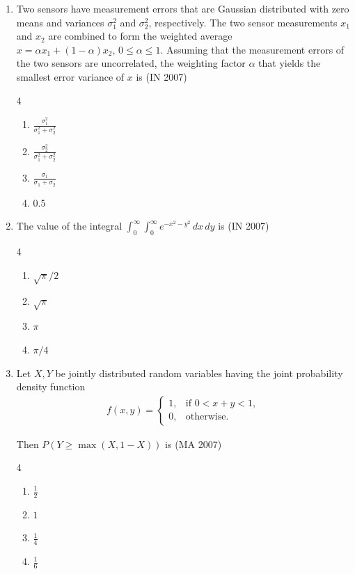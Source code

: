 \begin{enumerate}[label=\thesubsection.\arabic*,ref=\thesubsection.\theenumi]
\begin{multicols}{4}
\begin{enumerate}
\end{enumerate}
\end{multicols}
\item Two sensors have measurement errors that are Gaussian distributed with zero means and variances $\sigma_1^2$ and $\sigma_2^2$, respectively. The two sensor measurements $x_1$ and $x_2$ are combined to form the weighted average $x = \alpha x_1 + (1-\alpha)x_2, \, 0 \leq \alpha \leq 1$. Assuming that the measurement errors of the two sensors are uncorrelated, the weighting factor $\alpha$ that yields the smallest error variance of $x$ is  
\hfill(IN 2007)
\begin{multicols}{4}
\begin{enumerate}
\item $\frac{\sigma_1^2}{\sigma_1^2 + \sigma_2^2}$  
\item $\frac{\sigma_2^2}{\sigma_1^2 + \sigma_2^2}$  
\item $\frac{\sigma_1}{\sigma_1 + \sigma_2}$  
\item 0.5  
\end{enumerate}
\end{multicols}

\item The value of the integral $\int_{0}^{\infty} \int_{0}^{\infty} e^{-x^2-y^2} \, dx\, dy$ is  
\hfill(IN 2007)
\begin{multicols}{4}
\begin{enumerate}
\item $\sqrt{\pi}/2$  
\item $\sqrt{\pi}$  
\item $\pi$  
\item $\pi/4$  
\end{enumerate}
\end{multicols}

\item  Let $X, Y$ be jointly distributed random variables having the joint probability density function
\begin{align*}
f(x,y) = \begin{cases}
1, & \text{if } 0 < x + y < 1, \\
0, & \text{otherwise.}
\end{cases}
\end{align*}

Then $P(Y \ge \max(X, 1 - X))$ is
\hfill (MA 2007)

\begin{multicols}{4}
\begin{enumerate}
    \item $\tfrac{1}{2}$
    \item $1$
    \item $\tfrac{1}{4}$
    \item $\tfrac{1}{6}$
\end{enumerate}
\end{multicols}



\end{enumerate}
